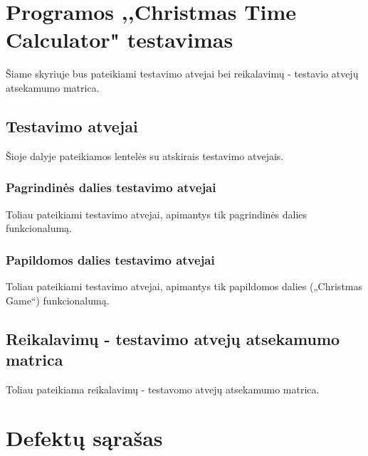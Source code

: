 \documentclass{VUMIFPSkursinis}
\begin{document}
	\section{Programos ,,Christmas Time Calculator" testavimas} \label{testavimas}
		Šiame skyriuje bus pateikiami testavimo atvejai bei reikalavimų - testavio atvejų atsekamumo matrica.
		\subsection{Testavimo atvejai} \label{testavimoAtvejai}
			Šioje dalyje pateikiamos lentelės su atskirais testavimo atvejais.
			\subsubsection{Pagrindinės dalies testavimo atvejai} \label{pagrindinesDaliesTA}
				Toliau pateikiami testavimo atvejai, apimantys tik pagrindinės dalies funkcionalumą.
			\subsubsection{Papildomos dalies testavimo atvejai} \label{papildomosDaliesTA}
				Toliau pateikiami testavimo atvejai, apimantys tik papildomos dalies („Christmas Game“) funkcionalumą.
		\subsection{Reikalavimų - testavimo atvejų atsekamumo matrica} \label{atsekamumo matrica}
			Toliau pateikiama reikalavimų - testavomo atvejų atsekamumo matrica.
	\section{Defektų sąrašas} \label{defektai}

	 \label{isvados}
	 \label{rezultatai}
\end{document}

